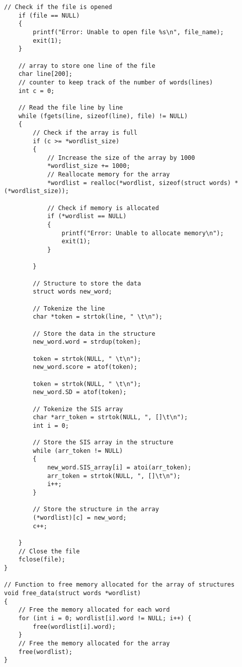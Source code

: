 \documentclass[a4paper,11pt]{article}
\theoremstyle{mytheor}
\begin{document}
\begin{lstlisting}[label={list:twelvth},caption=Appendix]
    // Check if the file is opened
    if (file == NULL)
    {
        printf("Error: Unable to open file %s\n", file_name);
        exit(1);
    }

    // array to store one line of the file 
    char line[200];
    // counter to keep track of the number of words(lines)
    int c = 0;

    // Read the file line by line
    while (fgets(line, sizeof(line), file) != NULL)
    {
        // Check if the array is full
        if (c >= *wordlist_size)
        {
            // Increase the size of the array by 1000
            *wordlist_size += 1000;
            // Reallocate memory for the array
            *wordlist = realloc(*wordlist, sizeof(struct words) * (*wordlist_size));

            // Check if memory is allocated
            if (*wordlist == NULL)
            {
                printf("Error: Unable to allocate memory\n");
                exit(1);
            }

        }

        // Structure to store the data
        struct words new_word;

        // Tokenize the line
        char *token = strtok(line, " \t\n");

        // Store the data in the structure
        new_word.word = strdup(token);

        token = strtok(NULL, " \t\n");
        new_word.score = atof(token);

        token = strtok(NULL, " \t\n");
        new_word.SD = atof(token);

        // Tokenize the SIS array
        char *arr_token = strtok(NULL, ", []\t\n");
        int i = 0;

        // Store the SIS array in the structure
        while (arr_token != NULL)
        {
            new_word.SIS_array[i] = atoi(arr_token);
            arr_token = strtok(NULL, ", []\t\n");
            i++;
        }

        // Store the structure in the array
        (*wordlist)[c] = new_word;
        c++;

    }
    // Close the file
    fclose(file);
}

// Function to free memory allocated for the array of structures
void free_data(struct words *wordlist)
{
    // Free the memory allocated for each word
    for (int i = 0; wordlist[i].word != NULL; i++) {
        free(wordlist[i].word);
    }
    // Free the memory allocated for the array
    free(wordlist);
}


\end{lstlisting}
\end{document}
